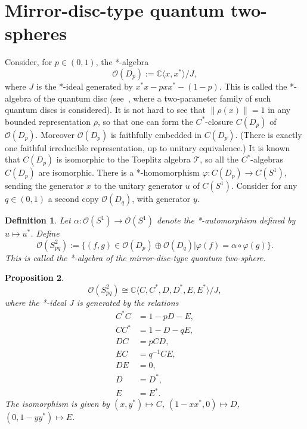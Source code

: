 \documentclass{book}
\newtheorem{definition}{Definition}[section]
\newtheorem{proposition}[definition]{Proposition}
\def\cstars{\(C^*\)-algebras}
\begin{document}
\section{Mirror-disc-type quantum two-spheres}\label{example:8413}
Consider, for \(p\in(0,1)\), the *-algebra
\begin{equation}
  \mathcal{O}(D_p):=\mathbb{C}\langle x,x^*\rangle/J,
\end{equation}
where \(J\) is the *-ideal generated by \(x^* x-px x^*-(1-p)\).
This is called the *-algebra of the quantum disc (see~\cite[1-23]{KL93}, where a two-parameter family of such quantum discs is considered).
It is not hard to see that \(\|\rho(x)\|=1\) in any bounded representation \(\rho\),
so that one can form the \(C^*\)-closure \(C(D_p)\) of \(\mathcal{O}(D_p)\). Moreover \(\mathcal{O}(D_p)\) is faithfully
embedded in \(C(D_p)\). (There is exactly one faithful irreducible representation, up to unitary equivalence.) 
It is known that \(C(D_p)\) is isomorphic to the Toeplitz algebra \(\mathcal{T}\), so all the \cstars\ \(C(D_p)\) are isomorphic.
There is a *-homomorphism \(\varphi:C(D_p)\rightarrow C(S^1)\), sending the generator \(x\) to the unitary generator \(u\) of \(C(S^1)\).
Consider for any \(q\in(0,1)\) a second copy \(\mathcal{O}(D_q)\), with generator \(y\).
\begin{definition}
  Let \(\alpha:\mathcal{O}(S^1)\rightarrow\mathcal{O}(S^1)\) denote the *-automorphism defined by \(u\mapsto u^*\). Define
  \begin{equation}
    \mathcal{O}(S^2_{pq}):=\{(f,g)\in\mathcal{O}(D_p)\oplus\mathcal{O}(D_q)| \varphi(f)=\alpha\circ\varphi(g)\}.
  \end{equation}
  This is called the *-algebra of the mirror-disc-type quantum two-sphere.
\end{definition}
\begin{proposition}
  \begin{equation}
    \mathcal{O}(S^2_{pq})\cong\mathbb{C}\langle C,C^*,D,D^*,E,E^*\rangle/J,
  \end{equation}
  where the *-ideal \(J\) is generated by the relations
  \begin{align*}
    C^* C&=1-pD-E,\\
    C C^*&=1-D-qE,\\
    DC&=pCD,\\
    EC&=q^{-1}CE,\\
    DE&=0,\\
    D&=D^*,\\
    E&=E^*.
  \end{align*}
  The isomorphism is given by \((x,y^*)\mapsto C\), \((1-x x^*,0)\mapsto D\),
  \((0,1-y y^*)\mapsto E\).
\end{proposition}
\end{document}
